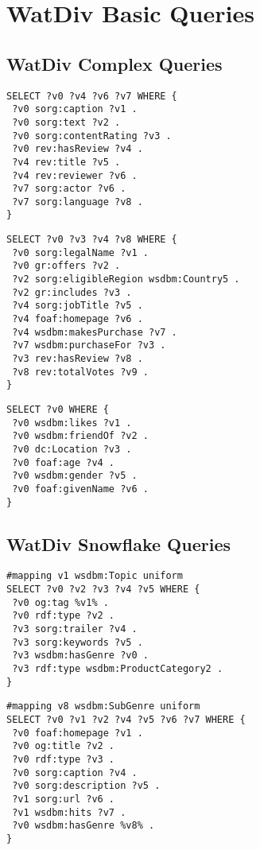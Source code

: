 \section{WatDiv Basic Queries} 
\label{queries:watdivbasic} 

\subsection{WatDiv Complex Queries} 

\begin{lstlisting}[caption={C1},label=query:C1]
SELECT ?v0 ?v4 ?v6 ?v7 WHERE {
 ?v0 sorg:caption ?v1 .
 ?v0 sorg:text ?v2 .
 ?v0 sorg:contentRating ?v3 .
 ?v0 rev:hasReview ?v4 .
 ?v4 rev:title ?v5 .
 ?v4 rev:reviewer ?v6 .
 ?v7 sorg:actor ?v6 .
 ?v7 sorg:language ?v8 .
}
\end{lstlisting}

\begin{lstlisting}[caption={C2},label=query:C2]
SELECT ?v0 ?v3 ?v4 ?v8 WHERE {
 ?v0 sorg:legalName ?v1 .
 ?v0 gr:offers ?v2 .
 ?v2 sorg:eligibleRegion wsdbm:Country5 .
 ?v2 gr:includes ?v3 .
 ?v4 sorg:jobTitle ?v5 .
 ?v4 foaf:homepage ?v6 .
 ?v4 wsdbm:makesPurchase ?v7 .
 ?v7 wsdbm:purchaseFor ?v3 .
 ?v3 rev:hasReview ?v8 .
 ?v8 rev:totalVotes ?v9 .
}
\end{lstlisting}

\begin{lstlisting}[caption={C3},label=query:C3]
SELECT ?v0 WHERE {
 ?v0 wsdbm:likes ?v1 .
 ?v0 wsdbm:friendOf ?v2 .
 ?v0 dc:Location ?v3 .
 ?v0 foaf:age ?v4 .
 ?v0 wsdbm:gender ?v5 .
 ?v0 foaf:givenName ?v6 .
}
\end{lstlisting}

\subsection{WatDiv Snowflake Queries} 

\begin{lstlisting}[caption={F1},label=query:F1]
#mapping v1 wsdbm:Topic uniform
SELECT ?v0 ?v2 ?v3 ?v4 ?v5 WHERE {
 ?v0 og:tag %v1% .
 ?v0 rdf:type ?v2 .
 ?v3 sorg:trailer ?v4 .
 ?v3 sorg:keywords ?v5 .
 ?v3 wsdbm:hasGenre ?v0 .
 ?v3 rdf:type wsdbm:ProductCategory2 .
}
\end{lstlisting}

\begin{lstlisting}[caption={F2},label=query:F2]
#mapping v8 wsdbm:SubGenre uniform
SELECT ?v0 ?v1 ?v2 ?v4 ?v5 ?v6 ?v7 WHERE {
 ?v0 foaf:homepage ?v1 .
 ?v0 og:title ?v2 .
 ?v0 rdf:type ?v3 .
 ?v0 sorg:caption ?v4 .
 ?v0 sorg:description ?v5 .
 ?v1 sorg:url ?v6 .
 ?v1 wsdbm:hits ?v7 .
 ?v0 wsdbm:hasGenre %v8% .
}
\end{lstlisting}

